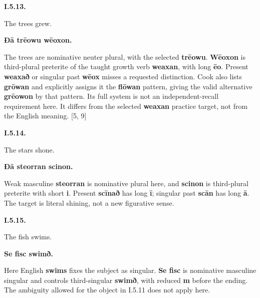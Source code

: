 \par\begin{minipage}{\linewidth}\raggedright
\textbf{I.5.13.}

The trees grew.

\textbf{Ðā trēowu wēoxon.}

The trees are nominative neuter plural, with the selected \textbf{trēowu}. \textbf{Wēoxon} is third-plural preterite of the taught growth verb \textbf{weaxan}, with long \textbf{ēo}. Present \textbf{weaxað} or singular past \textbf{wēox} misses a requested distinction. Cook also lists \textbf{grōwan} and explicitly assigns it the \textbf{flōwan} pattern, giving the valid alternative \textbf{grēowon} by that pattern. Its full system is not an independent-recall requirement here. It differs from the selected \textbf{weaxan} practice target, not from the English meaning. [5, 9]

\end{minipage}\par\addvspace{4pt}

\par\begin{minipage}{\linewidth}\raggedright
\textbf{I.5.14.}

The stars shone.

\textbf{Ðā steorran scinon.}

Weak masculine \textbf{steorran} is nominative plural here, and \textbf{scinon} is third-plural preterite with short \textbf{i}. Present \textbf{scīnað} has long \textbf{ī}; singular past \textbf{scān} has long \textbf{ā}. The target is literal shining, not a new figurative sense.

\end{minipage}\par\addvspace{4pt}

\par\begin{minipage}{\linewidth}\raggedright
\textbf{I.5.15.}

The fish swims.

\textbf{Se fisc swimð.}

Here English \textbf{swims} fixes the subject as singular. \textbf{Se fisc} is nominative masculine singular and controls third-singular \textbf{swimð}, with reduced \textbf{m} before the ending. The ambiguity allowed for the object in I.5.11 does not apply here.

\end{minipage}\par\addvspace{4pt}

